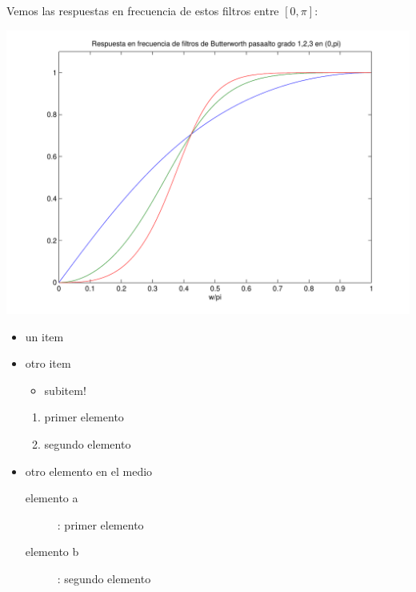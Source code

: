 \documentclass[a4paper]{article}
\begin{document}
{\small

}
Vemos las respuestas en frecuencia de estos filtros entre $[0,\pi]$:

\includegraphics[width=14cm]{img/ej2}
%


\begin{itemize}
\item un item
\item otro item
\begin{itemize}
\item subitem!
\end{itemize}

\begin{enumerate}
\item primer elemento
\item segundo elemento
\end{enumerate}

\item otro elemento en el medio
\begin{description}
\item[elemento a]: primer elemento
\item[elemento b]: segundo elemento
\end{description}
\end{itemize}
\end{document}
